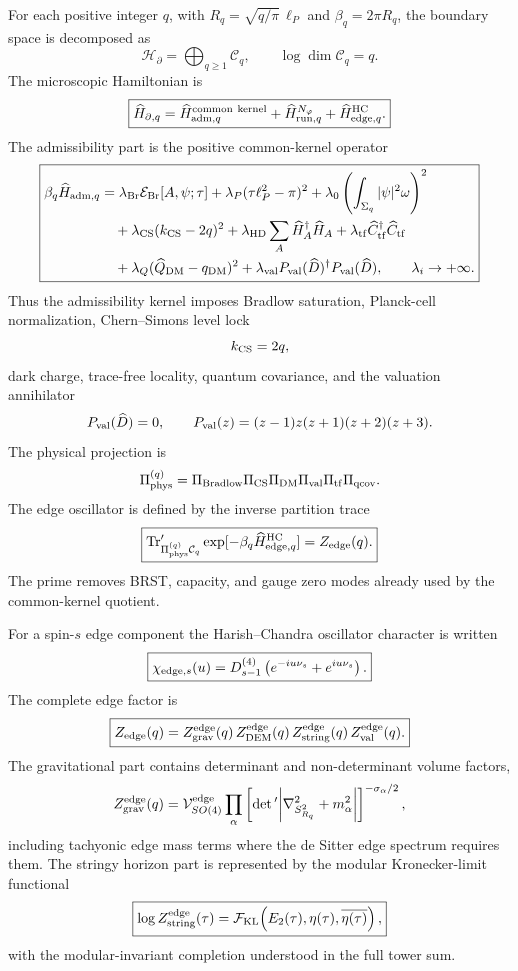 \documentclass[aps,prd,reprint,nofootinbib,superscriptaddress,floatfix]{revtex4-2}
\numberwithin{equation}{section}
\theoremstyle{definition}
\theoremstyle{plain}
\begin{document}
For each positive integer \(q\), with \(R_q=\sqrt{q/\pi}\,\ell_P\) and
\(\beta_q=2\pi R_q\), the boundary space is decomposed as
\[
\boxed{
\mathcal H_\partial
=
\bigoplus_{q\ge1}\mathcal C_q,
\qquad
\log\dim\mathcal C_q=q.
}
\]
The microscopic Hamiltonian is
\[
\boxed{
\widehat H_{\partial,q}
=
\widehat H_{{\rm adm},q}^{\rm common\ kernel}
+
\widehat H_{{\rm run},q}^{N_\varphi}
+
\widehat H_{{\rm edge},q}^{\rm HC}.
}
\]
The admissibility part is the positive common-kernel operator
\[
\boxed{
\begin{aligned}
\beta_q\widehat H_{{\rm adm},q}
&=
\lambda_{\rm Br}\mathcal E_{\rm Br}[A,\psi;\tau]
+\lambda_P(\tau\ell_P^2-\pi)^2
+\lambda_0\left(\int_{\Sigma_q}|\psi|^2\omega\right)^2
\\
&\quad
+\lambda_{\rm CS}(k_{\rm CS}-2q)^2
+\lambda_{\rm HD}\sum_A\widehat H_A^\dagger\widehat H_A
+\lambda_{\rm tf}\widehat C_{\rm tf}^\dagger\widehat C_{\rm tf}
\\
&\quad
+\lambda_Q(\widehat Q_{\rm DM}-q_{\rm DM})^2
+\lambda_{\rm val}
P_{\rm val}(\widehat D)^\dagger P_{\rm val}(\widehat D),
\qquad
\lambda_i\rightarrow+\infty .
\end{aligned}
}
\]
Thus the admissibility kernel imposes Bradlow saturation, Planck-cell
normalization, Chern--Simons level lock
\[
k_{\rm CS}=2q,
\]
dark charge, trace-free locality, quantum covariance, and the valuation
annihilator
\[
P_{\rm val}(\widehat D)=0,
\qquad
P_{\rm val}(z)=(z-1)z(z+1)(z+2)(z+3).
\]
The physical projection is
\[
\Pi_{\rm phys}^{(q)}
=
\Pi_{\rm Bradlow}\Pi_{\rm CS}\Pi_{\rm DM}\Pi_{\rm val}
\Pi_{\rm tf}\Pi_{\rm qcov}.
\]
The edge oscillator is defined by the inverse partition trace
\[
\boxed{
\operatorname{Tr}'_{\Pi_{\rm phys}^{(q)}\mathcal C_q}
\exp[-\beta_q\widehat H_{{\rm edge},q}^{\rm HC}]
=
Z_{\rm edge}(q).
}
\]
The prime removes BRST, capacity, and gauge zero modes already used by the
common-kernel quotient.

For a spin-\(s\) edge component the Harish--Chandra oscillator character is
written
\[
\boxed{
\chi_{{\rm edge},s}(u)
=
D^{(4)}_{s-1}
\left(e^{-iu\nu_s}+e^{iu\nu_s}\right).
}
\]
The complete edge factor is
\[
\boxed{
Z_{\rm edge}(q)
=
Z_{\rm grav}^{\rm edge}(q)\,
Z_{\rm DEM}^{\rm edge}(q)\,
Z_{\rm string}^{\rm edge}(q)\,
Z_{\rm val}^{\rm edge}(q).
}
\]
The gravitational part contains determinant and non-determinant volume factors,
\[
Z_{\rm grav}^{\rm edge}(q)
=
\mathcal V_{SO(4)}^{\rm edge}
\prod_\alpha
\left[
\det{}'\!\left|\nabla_{S^2_{R_q}}^2+m_\alpha^2\right|
\right]^{-\sigma_\alpha/2},
\]
including tachyonic edge mass terms where the de Sitter edge spectrum requires
them.  The stringy horizon part is represented by the modular Kronecker-limit
functional
\[
\boxed{
\log Z_{\rm string}^{\rm edge}(\tau)
=
\mathcal F_{\rm KL}
\!\left(E_2(\tau),\eta(\tau),\overline{\eta(\tau)}\right),
}
\]
with the modular-invariant completion understood in the full tower sum.
\end{document}
